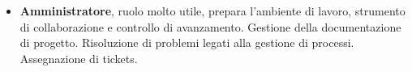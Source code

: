 \documentclass[10pt]{article}
\begin{document}
\begin{itemize}
\begin{itemize}
\begin{itemize}
	\item \textbf{Amministratore}, ruolo molto utile, prepara l'ambiente di 
	lavoro, strumento di collaborazione e controllo di avanzamento. Gestione 
	della documentazione di progetto. 
	Risoluzione di problemi legati alla gestione di processi. Assegnazione di 
	tickets.
	\end{itemize}

\end{itemize}





\end{itemize}
\end{document}
